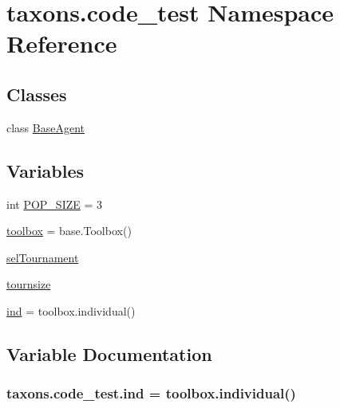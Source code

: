 \hypertarget{namespacetaxons_1_1code__test}{}\section{taxons.\+code\+\_\+test Namespace Reference}
\label{namespacetaxons_1_1code__test}
\subsection*{Classes}
\begin{DoxyCompactItemize}
\item 
class \hyperlink{classtaxons_1_1code__test_1_1_base_agent}{Base\+Agent}
\end{DoxyCompactItemize}
\subsection*{Variables}
\begin{DoxyCompactItemize}
\item 
int \hyperlink{namespacetaxons_1_1code__test_a8569468f740d92c4a566bb9146b76557}{P\+O\+P\+\_\+\+S\+I\+ZE} = 3
\item 
\hyperlink{namespacetaxons_1_1code__test_acca76328ef126834697401bc94d809c0}{toolbox} = base.\+Toolbox()
\item 
\hyperlink{namespacetaxons_1_1code__test_a9cc5ffc83463615e3bcfdca5fed772f3}{sel\+Tournament}
\item 
\hyperlink{namespacetaxons_1_1code__test_ac0fac4a837a876741a76e98e83a43491}{tournsize}
\item 
\hyperlink{namespacetaxons_1_1code__test_a7b2bc4dad27c7d3b250a37c2b4625884}{ind} = toolbox.\+individual()
\end{DoxyCompactItemize}


\subsection{Variable Documentation}
\subsubsection[{\texorpdfstring{ind}{ind}}]{\setlength{\rightskip}{0pt plus 5cm}taxons.\+code\+\_\+test.\+ind = toolbox.\+individual()}\hypertarget{namespacetaxons_1_1code__test_a7b2bc4dad27c7d3b250a37c2b4625884}{}\label{namespacetaxons_1_1code__test_a7b2bc4dad27c7d3b250a37c2b4625884}
